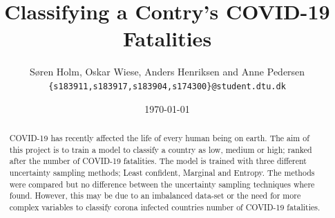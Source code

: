 \documentclass[12pt,fleqn]{article}
\title{\vspace*{-3.75cm}Classifying a Contry's COVID-19 Fatalities}
\author{Søren Holm, Oskar Wiese, Anders Henriksen and Anne Pedersen \\
	\small {\texttt{\{s183911,s183917,s183904,s174300\}@student.dtu.dk}}}
\date{\today}
\begin{document}
	
	\maketitle
	 
	
	\begin{abstract} %
		\noindent COVID-19 has recently affected the life of every human being on earth. The aim of this project is to train a model to classify a country as low, medium or high; ranked after the number of COVID-19 fatalities. The model is trained with three different uncertainty sampling methods; Least confident, Marginal and Entropy. The methods were compared but no difference between the uncertainty sampling techniques where found. However, this may be due to an imbalanced data-set or the need for more complex variables to classify corona infected countries number of COVID-19 fatalities.
	\end{abstract}
	
\end{document}
